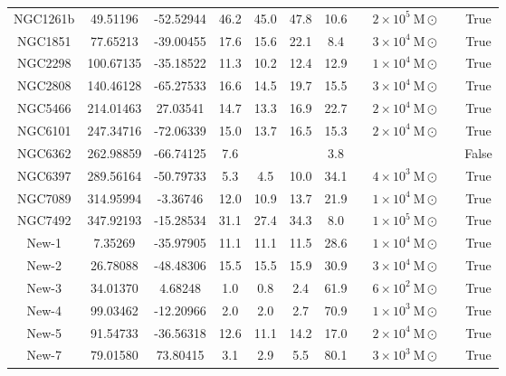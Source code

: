 \begin{table}
\begin{tabular}{ccccccccccc}
NGC1261b & 49.51196 & -52.52944 & 46.2 & 45.0 & 47.8 & 10.6 & \citet{ibata:2023} & $2 \times 10^{5}~\mathrm{M}\odot$ &  & True \\
NGC1851 & 77.65213 & -39.00455 & 17.6 & 15.6 & 22.1 & 8.4 & \citet{ibata:2023} & $3 \times 10^{4}~\mathrm{M}\odot$ &  & True \\
NGC2298 & 100.67135 & -35.18522 & 11.3 & 10.2 & 12.4 & 12.9 & \citet{ibata:2023} & $1 \times 10^{4}~\mathrm{M}\odot$ &  & True \\
NGC2808 & 140.46128 & -65.27533 & 16.6 & 14.5 & 19.7 & 15.5 & \citet{ibata:2023} & $3 \times 10^{4}~\mathrm{M}\odot$ &  & True \\
NGC5466 & 214.01463 & 27.03541 & 14.7 & 13.3 & 16.9 & 22.7 & \citet{ibata:2023} & $2 \times 10^{4}~\mathrm{M}\odot$ &  & True \\
NGC6101 & 247.34716 & -72.06339 & 15.0 & 13.7 & 16.5 & 15.3 & \citet{ibata:2023} & $2 \times 10^{4}~\mathrm{M}\odot$ &  & True \\
NGC6362 & 262.98859 & -66.74125 & 7.6 & & & 3.8 & \citet{sollima:2020} & &  & False \\
NGC6397 & 289.56164 & -50.79733 & 5.3 & 4.5 & 10.0 & 34.1 & \citet{ibata:2023} & $4 \times 10^{3}~\mathrm{M}\odot$ &  & True \\
NGC7089 & 314.95994 & -3.36746 & 12.0 & 10.9 & 13.7 & 21.9 & \citet{ibata:2023} & $1 \times 10^{4}~\mathrm{M}\odot$ &  & True \\
NGC7492 & 347.92193 & -15.28534 & 31.1 & 27.4 & 34.3 & 8.0 & \citet{ibata:2023} & $1 \times 10^{5}~\mathrm{M}\odot$ &  & True \\
New-1 & 7.35269 & -35.97905 & 11.1 & 11.1 & 11.5 & 28.6 & \citet{ibata:2023} & $1 \times 10^{4}~\mathrm{M}\odot$ &  & True \\
New-2 & 26.78088 & -48.48306 & 15.5 & 15.5 & 15.9 & 30.9 & \citet{ibata:2023} & $3 \times 10^{4}~\mathrm{M}\odot$ &  & True \\
New-3 & 34.01370 & 4.68248 & 1.0 & 0.8 & 2.4 & 61.9 & \citet{ibata:2023} & $6 \times 10^{2}~\mathrm{M}\odot$ &  & True \\
New-4 & 99.03462 & -12.20966 & 2.0 & 2.0 & 2.7 & 70.9 & \citet{ibata:2023} & $1 \times 10^{3}~\mathrm{M}\odot$ &  & True \\
New-5 & 91.54733 & -36.56318 & 12.6 & 11.1 & 14.2 & 17.0 & \citet{ibata:2023} & $2 \times 10^{4}~\mathrm{M}\odot$ &  & True \\
New-7 & 79.01580 & 73.80415 & 3.1 & 2.9 & 5.5 & 80.1 & \citet{ibata:2023} & $3 \times 10^{3}~\mathrm{M}\odot$ &  & True \\

\end{tabular}
\end{table}
